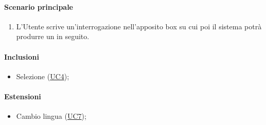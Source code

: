 \paragraph*{Scenario principale}
\begin{enumerate}
  \item L’Utente scrive un'interrogazione nell’apposito box su cui poi il sistema potrà produrre un  in seguito.
\end{enumerate}

\paragraph*{Inclusioni}
\begin{itemize}
  \item Selezione  (\hyperref[UC4]{UC4});
\end{itemize}

\paragraph*{Estensioni}
\begin{itemize}
  \item Cambio lingua (\hyperref[UC7]{UC7});
\end{itemize}
